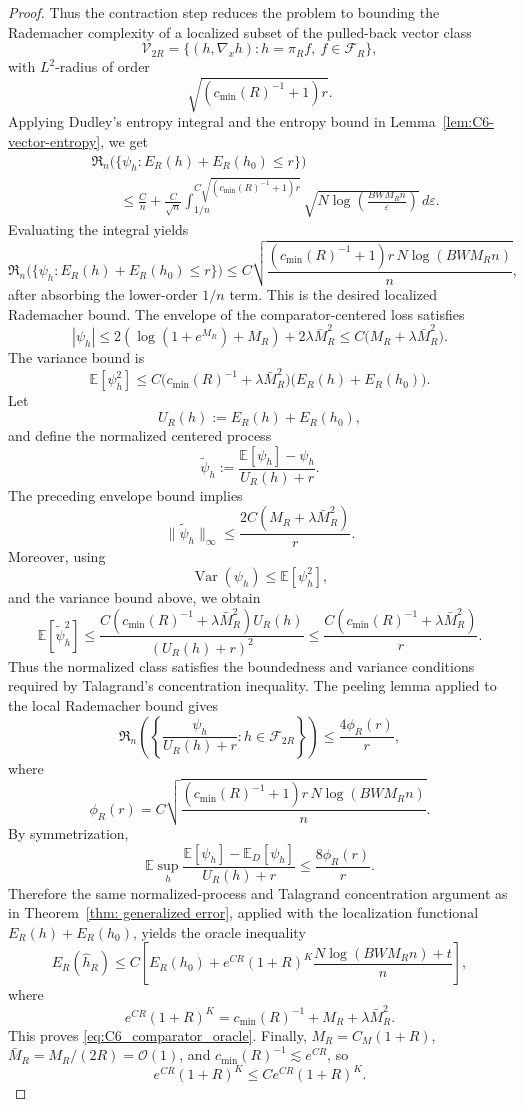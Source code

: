 \documentclass[11pt]{article}
\theoremstyle{plain}
\theoremstyle{definition}
\theoremstyle{remark}
\begin{document}
\begin{proof}
Thus the contraction step reduces the problem to bounding the Rademacher
complexity of a localized subset of the pulled-back vector class
\[
\mathcal V_{2R}
=
\{(h,\nabla_xh):h=\pi_R f,\ f\in\mathcal F_R\},
\]
with \(L^2\)-radius of order
\[
\sqrt{(c_{\min}(R)^{-1}+1)r}.
\]
Applying Dudley's entropy integral and the entropy bound in
Lemma~\ref{lem:C6-vector-entropy}, we get
\[
\begin{aligned}
&\mathfrak R_n
\bigl(
\{\psi_h:E_R(h)+E_R(h_0)\le r\}
\bigr)\\
&\qquad\le
\frac{C}{n}
+
\frac{C}{\sqrt n}
\int_{1/n}^{C\sqrt{(c_{\min}(R)^{-1}+1)r}}
\sqrt{
N\log\left(\frac{BWM_R n}{\varepsilon}\right)
}
\,d\varepsilon.
\end{aligned}
\tag{C.xx}
\]
Evaluating the integral yields
\[
\mathfrak R_n
\bigl(
\{\psi_h:E_R(h)+E_R(h_0)\le r\}
\bigr)
\le
C
\sqrt{
\frac{(c_{\min}(R)^{-1}+1)r\,N\log(BWM_R n)}{n}
},
\]
after absorbing the lower-order \(1/n\) term. This is the desired localized
Rademacher bound.
The envelope of the comparator-centered loss satisfies
\[
|\psi_h|
\le
2(\log(1+e^{M_R})+M_R)
+
2\lambda\bar M_R^2
\le
C\bigl(M_R+\lambda\bar M_R^2\bigr).
\]
The variance bound is
\[
\mathbb E[\psi_h^2]
\le
C\bigl(c_{\min}(R)^{-1}+\lambda\bar M_R^2\bigr)
\bigl(E_R(h)+E_R(h_0)\bigr).
\]
Let
\[
U_R(h):=E_R(h)+E_R(h_0),
\]
and define the normalized centered process
\[
\widetilde\psi_h:=
\frac{\mathbb E[\psi_h]-\psi_h}{U_R(h)+r}.
\]
The preceding envelope bound implies
\[
\|\widetilde\psi_h\|_\infty
\le
\frac{2C(M_R+\lambda\bar M_R^2)}{r}.
\]
Moreover, using
\[
\operatorname{Var}(\psi_h)\le \mathbb E[\psi_h^2],
\]
and the variance bound above, we obtain
\[
\mathbb E[\widetilde\psi_h^2]
\le
\frac{
C(c_{\min}(R)^{-1}+\lambda\bar M_R^2)U_R(h)
}{
(U_R(h)+r)^2
}
\le
\frac{C(c_{\min}(R)^{-1}+\lambda\bar M_R^2)}{r}.
\]
Thus the normalized class satisfies the boundedness and variance conditions
required by Talagrand's concentration inequality. The peeling lemma applied to the local Rademacher bound gives
\[
\mathfrak R_n
\left(
\left\{
\frac{\psi_h}{U_R(h)+r}:h\in\mathcal F_{2R}
\right\}
\right)
\le
\frac{4\phi_R(r)}{r},
\]
where
\[
\phi_R(r)
=
C
\sqrt{
\frac{(c_{\min}(R)^{-1}+1)r\,N\log(BWM_R n)}{n}
}.
\]
By symmetrization,
\[
\mathbb E
\sup_h
\frac{\mathbb E[\psi_h]-\mathbb E_D[\psi_h]}{U_R(h)+r}
\le
\frac{8\phi_R(r)}{r}.
\]
Therefore the same normalized-process and Talagrand concentration argument as in
Theorem~\ref{thm: generalized error}, applied with the localization
functional \(E_R(h)+E_R(h_0)\), yields the oracle inequality
\[
E_R(\widehat h_R)
\le
C\left[
E_R(h_0)
+
e^{CR}(1+R)^K
\frac{N\log(BWM_R n)+t}{n}
\right],
\]
where
\[
e^{CR}(1+R)^K=c_{\min}(R)^{-1}+M_R+\lambda\bar M_R^2.
\]
This proves \eqref{eq:C6_comparator_oracle}. Finally,
\(M_R=C_M(1+R)\), \(\bar M_R=M_R/(2R)=\mathcal{O}(1)\), and
\(c_{\min}(R)^{-1}\lesssim e^{CR}\), so
\[
e^{CR}(1+R)^K\le C e^{CR}(1+R)^K.
\]
\end{proof}
\end{document}
